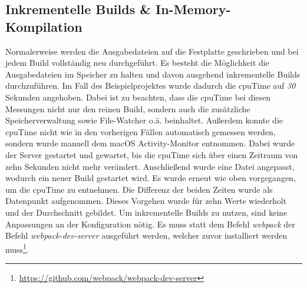 \documentclass[11pt]{report}
\begin{document}
    		\subsection{Inkrementelle Builds \& In-Memory-Kompilation}
    			\label{section:incrementalBuilds}
    			Normalerweise werden die Ausgabedateien auf die Festplatte geschrieben und bei jedem Build vollständig neu durchgeführt. Es besteht die Möglichkeit die Ausgabedateien im Speicher zu halten und davon ausgehend inkrementelle Builds durchzuführen. Im Fall des Beispielprojektes wurde dadurch die \Gls{cpuTime} auf \emph{30} Sekunden angehoben. Dabei ist zu beachten, dass die \Gls{cpuTime} bei diesen Messungen nicht nur den reinen Build, sondern auch die zusätzliche Speicherverwaltung sowie File-Watcher o.ä. beinhaltet. Außerdem konnte die \Gls{cpuTime} nicht wie in den vorherigen Fällen automatisch gemessen werden, sondern wurde manuell dem macOS Activity-Monitor entnommen. Dabei wurde der Server gestartet und gewartet, bis die \Gls{cpuTime} sich über einen Zeitraum von zehn Sekunden nicht mehr verändert. Anschließend wurde eine Datei angepasst, wodurch ein neuer Build gestartet wird. Es wurde erneut wie oben vorgegangen, um die \Gls{cpuTime} zu entnehmen. Die Differenz der beiden Zeiten wurde als Datenpunkt aufgenommen. Dieses Vorgehen wurde für zehn Werte wiederholt und der Durchschnitt gebildet. Um inkrementelle Builds zu nutzen, sind keine Anpassungen an der Konfiguration nötig. Es muss statt dem Befehl \emph{webpack} der Befehl \emph{webpack-dev-server} ausgeführt werden, welcher zuvor installiert werden muss\footnote{\url{https://github.com/webpack/webpack-dev-server}}.
\end{document}
